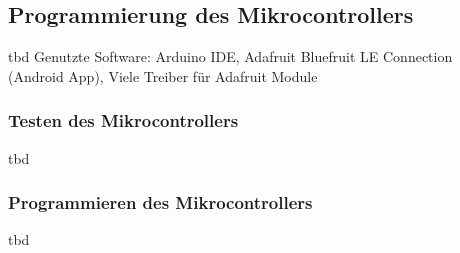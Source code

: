 \subsection{Programmierung des Mikrocontrollers}
tbd
Genutzte Software: Arduino IDE, Adafruit Bluefruit LE Connection (Android App), Viele Treiber für Adafruit Module


\subsubsection*{Testen des Mikrocontrollers} 
tbd

\subsubsection*{Programmieren des Mikrocontrollers}
tbd
